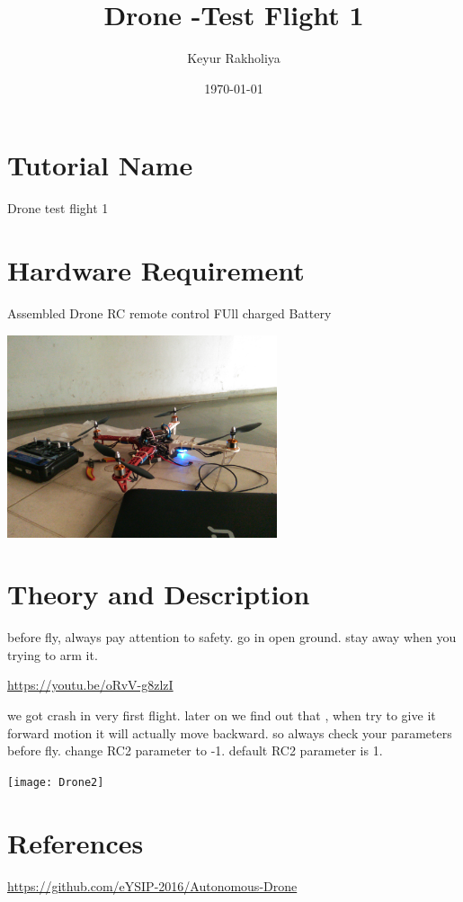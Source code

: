 \documentclass[11pt,a4paper]{article}
\title{Drone -Test Flight 1}
\author{Keyur Rakholiya}
\date{\today}
\begin{document}
	\maketitle
	\newpage
	\tableofcontents
	\newpage
	\section{Tutorial Name}
	Drone test flight 1
	
	\section{Hardware Requirement}
	Assembled Drone
	RC remote control
	FUll charged Battery
	\begin{center}
		\includegraphics[width=300px]{Drone}
	\end{center}
	

	\newpage
	\section{Theory and Description}
		before fly, always pay attention to safety. go in open ground. stay away when you trying to arm it.\newline
		
		\url{https://youtu.be/oRvV-g8zlzI}
		\newline
		
		we got crash in very first flight. later on we find out that , when try to give it forward motion it will actually move backward. so always check your parameters before fly. 
		change RC2 parameter to -1. default RC2 parameter is 1.
		
		\texttt{[image: Drone2]}
		
	\section{References}
	\url{https://github.com/eYSIP-2016/Autonomous-Drone}
	
\end{document}
